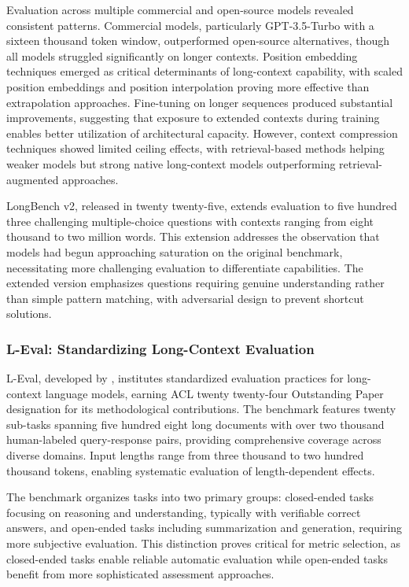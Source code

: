 Evaluation across multiple commercial and open-source models revealed consistent patterns. Commercial models, particularly GPT-3.5-Turbo with a sixteen thousand token window, outperformed open-source alternatives, though all models struggled significantly on longer contexts. Position embedding techniques emerged as critical determinants of long-context capability, with scaled position embeddings and position interpolation proving more effective than extrapolation approaches. Fine-tuning on longer sequences produced substantial improvements, suggesting that exposure to extended contexts during training enables better utilization of architectural capacity. However, context compression techniques showed limited ceiling effects, with retrieval-based methods helping weaker models but strong native long-context models outperforming retrieval-augmented approaches.

LongBench v2, released in twenty twenty-five, extends evaluation to five hundred three challenging multiple-choice questions with contexts ranging from eight thousand to two million words. This extension addresses the observation that models had begun approaching saturation on the original benchmark, necessitating more challenging evaluation to differentiate capabilities. The extended version emphasizes questions requiring genuine understanding rather than simple pattern matching, with adversarial design to prevent shortcut solutions.

\subsubsection{L-Eval: Standardizing Long-Context Evaluation}

L-Eval, developed by \citet{an2024leval}, institutes standardized evaluation practices for long-context language models, earning ACL twenty twenty-four Outstanding Paper designation for its methodological contributions. The benchmark features twenty sub-tasks spanning five hundred eight long documents with over two thousand human-labeled query-response pairs, providing comprehensive coverage across diverse domains. Input lengths range from three thousand to two hundred thousand tokens, enabling systematic evaluation of length-dependent effects.

The benchmark organizes tasks into two primary groups: closed-ended tasks focusing on reasoning and understanding, typically with verifiable correct answers, and open-ended tasks including summarization and generation, requiring more subjective evaluation. This distinction proves critical for metric selection, as closed-ended tasks enable reliable automatic evaluation while open-ended tasks benefit from more sophisticated assessment approaches.

